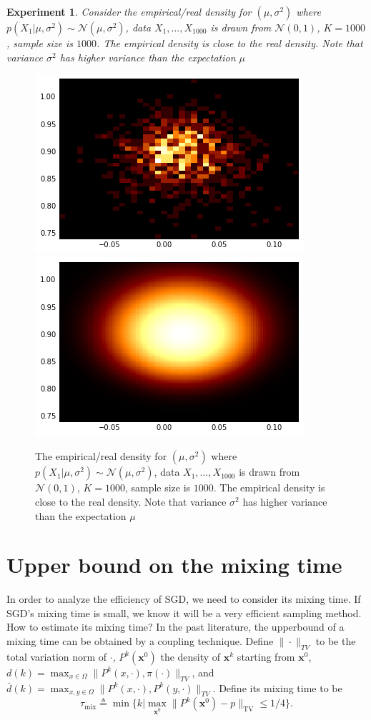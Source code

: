\documentclass[preprint,12pt,3p]{elsarticle}
\newcommand{\bx}{\mathbf{x}}
\newcommand{\N}{\mathscr{N}}
\newtheorem{experiment}{Experiment}
\begin{document}
\begin{experiment}
Consider the empirical/real density for $(\mu, \sigma^2)$ where $p(X_1|\mu, \sigma^2)\sim \N(\mu, \sigma^2)$, data $X_1,\ldots, X_{1000}$ is drawn from $\N(0, 1)$, $K = 1000$, sample size is $1000$. The empirical density is close to the real density. Note that variance $\sigma^2$ has higher variance than the expectation $\mu$
\end{experiment}
\begin{figure}
\includegraphics[width=0.5\linewidth]{../figure/simulation2_empirical.png}
\includegraphics[width=0.5\linewidth]{../figure/simulation2_real.png}
\caption{The empirical/real density for $(\mu, \sigma^2)$ where $p(X_1|\mu, \sigma^2)\sim \N(\mu, \sigma^2)$, data $X_1,\ldots, X_{1000}$ is drawn from $\N(0, 1)$, $K = 1000$, sample size is $1000$. The empirical density is close to the real density. Note that variance $\sigma^2$ has higher variance than the expectation $\mu$}
\end{figure}
\section{Upper bound on the mixing time} %
\label{sec:upper_bound_on_the_mixing_time}
In order to analyze the efficiency of SGD, we need to consider its mixing time. If SGD's mixing time is small, we know it will be a very efficient sampling method. How to estimate its mixing time? In the past literature, the upperbound of a mixing time can be obtained by a coupling technique. Define $\|\cdot\|_{TV}$ to be the total variation norm of $\cdot$, $P^k(\bx^0)$ the density of $\bx^k$ starting from $\bx^0$, $d(k) = \max_{x\in \Omega} \|P^k(x, \cdot), \pi(\cdot)\|_{TV}$, and $\bar{d}(k) = \max_{x,y\in \Omega} \|P^k(x, \cdot), P^k(y,\cdot)\|_{TV}$. 
Define its mixing time to be 
\[
\tau_{\mathrm{mix}} \triangleq \min\{k|\max_{\bx^0}\|P^k(\bx^0) - p\|_{\mathrm{TV}}\leq 1/4\}.
\]
\end{document}
